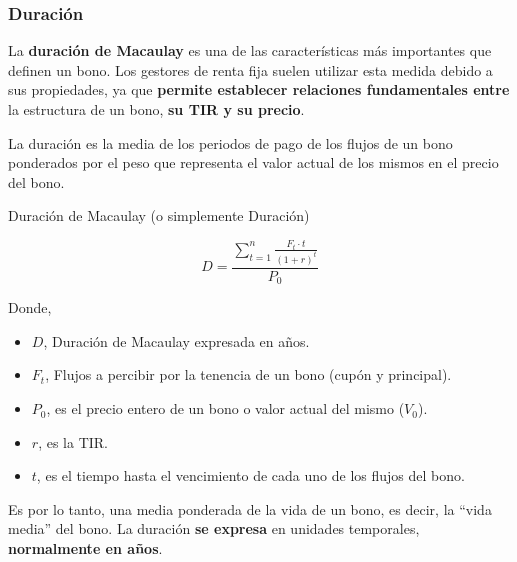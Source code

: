\documentclass[
  letterpaper,
  DIV=11,
  numbers=noendperiod]{scrartcl}
\begin{document}
\hypertarget{duraciuxf3n}{%
\subsubsection{Duración}\label{duraciuxf3n}}

La \textbf{duración de Macaulay} es una de las características más
importantes que definen un bono. Los gestores de renta fija suelen
utilizar esta medida debido a sus propiedades, ya que \textbf{permite
establecer relaciones fundamentales entre} la estructura de un bono,
\textbf{su TIR y su precio}.

La duración es la media de los periodos de pago de los flujos de un bono
ponderados por el peso que representa el valor actual de los mismos en
el precio del bono.

\begin{tcolorbox}[enhanced jigsaw, colframe=quarto-callout-note-color-frame, opacityback=0, colback=white, leftrule=.75mm, left=2mm, breakable, arc=.35mm, rightrule=.15mm, toprule=.15mm, bottomrule=.15mm]
\begin{minipage}[t]{5.5mm}
\textcolor{quarto-callout-note-color}{\faInfo}
\end{minipage}%
\begin{minipage}[t]{\textwidth - 5.5mm}

Duración de Macaulay (o simplemente Duración)

\[D=\frac{\sum_{t=1}^{n}\frac{F_t\cdot t}{\left(1+r\right)^t}}{P_0}\]

Donde,

\begin{itemize}
\item
  \(D\), Duración de Macaulay expresada en años.
\item
  \(F_t\), Flujos a percibir por la tenencia de un bono (cupón y
  principal).
\item
  \(P_0\), es el precio entero de un bono o valor actual del mismo
  (\(V_0\)).
\item
  \(r\), es la TIR.
\item
  \(t\), es el tiempo hasta el vencimiento de cada uno de los flujos del
  bono.
\end{itemize}

\end{minipage}%
\end{tcolorbox}

Es por lo tanto, una media ponderada de la vida de un bono, es decir, la
``vida media'' del bono. La duración \textbf{se expresa} en unidades
temporales, \textbf{normalmente en años}.
\end{document}
